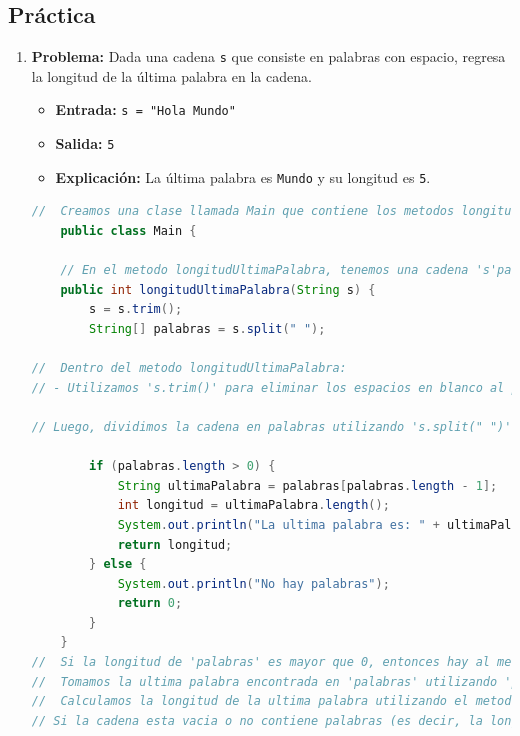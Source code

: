 \documentclass{article}
\begin{document}
\subsection*{Práctica}
\begin{enumerate}
    \item \textbf{Problema:} Dada una cadena \texttt{s} que consiste en palabras
    con espacio, regresa la longitud de la última palabra en la cadena.
    \begin{itemize}
        \item \textbf{Entrada:} \texttt{s = "Hola Mundo"}
        \item \textbf{Salida:} \texttt{5}
        \item \textbf{Explicación:} La última palabra es \texttt{Mundo} y su
        longitud es \texttt{5}.
    \end{itemize}
    
    \begin{lstlisting}[language=Java]
    //  Creamos una clase llamada Main que contiene los metodos longitudUltimaPalabra y main.
    public class Main {
    
    // En el metodo longitudUltimaPalabra, tenemos una cadena 's'para calcular la longitud de la ultima palabra en la cadena.
    public int longitudUltimaPalabra(String s) {
        s = s.trim();
        String[] palabras = s.split(" ");
        
//  Dentro del metodo longitudUltimaPalabra:
// - Utilizamos 's.trim()' para eliminar los espacios en blanco al principio y al final de la cadena para que no haya espacios adicionales.

// Luego, dividimos la cadena en palabras utilizando 's.split(" ")', que divide la cadena en palabras separadas por espacios en blanco. El resultado es un arreglo de cadenas que llamamos 'palabras'.

        if (palabras.length > 0) {
            String ultimaPalabra = palabras[palabras.length - 1];
            int longitud = ultimaPalabra.length();
            System.out.println("La ultima palabra es: " + ultimaPalabra + " y su longitud es: " + longitud);
            return longitud;
        } else {
            System.out.println("No hay palabras");
            return 0;
        }
    }
//  Si la longitud de 'palabras' es mayor que 0, entonces hay al menos una palabra en la cadena y se obtiene la ultima palabra.
//  Tomamos la ultima palabra encontrada en 'palabras' utilizando 'palabras[palabras.length - 1]'.
//  Calculamos la longitud de la ultima palabra utilizando el metodo 'length()'
// Si la cadena esta vacia o no contiene palabras (es decir, la longitud de 'palabras' es 0), entonces regrsa 0.


\end{lstlisting}
\end{enumerate}
\end{document}
